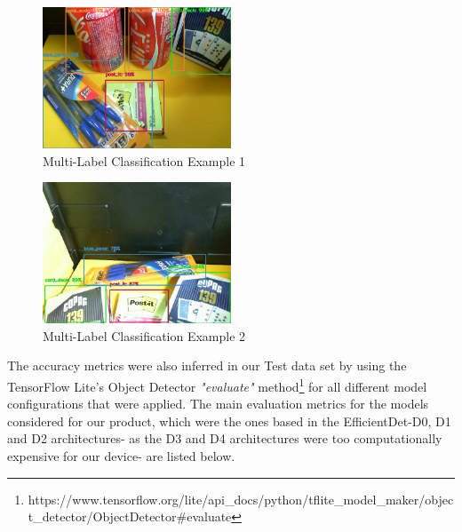 \documentclass[openright]{normas-utf-tex} %
\begin{document}
\begin{figure}[H]
	\centering
	\includegraphics[width=0.5\textwidth]{./images/multilabel-classification-1.png}
	\caption[Multi-Label Classification Example 1]{Multi-Label Classification Example 1}
\end{figure}

\begin{figure}[H]
	\centering
	\includegraphics[width=0.5\textwidth]{./images/multilabel-classification-2.png}
	\caption[Multi-Label Classification Example 2]{Multi-Label Classification Example 2}
\end{figure}

The accuracy metrics were also inferred in our Test data set by using the TensorFlow Lite's 
Object Detector \textit{"evaluate"} method\footnote{https://www.tensorflow.org/lite/api\_docs/python/tflite\_model\_maker/object\_detector/ObjectDetector\#evaluate}
for all different model configurations that were applied. 
The main evaluation metrics for the models considered for our product, which were the ones based 
in the EfficientDet-D0, D1 and D2 architectures- as the D3 and D4 architectures were too 
computationally expensive for our device- are listed below. 
\end{document}
